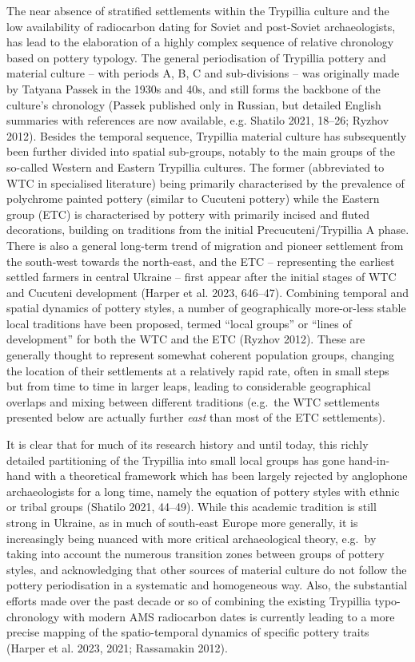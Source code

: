 \documentclass[
  12pt,
  a4paper, twoside]{book}
\begin{document}
The near absence of stratified settlements within the Trypillia culture and the low availability of radiocarbon dating for Soviet and post-Soviet archaeologists, has lead to the elaboration of a highly complex sequence of relative chronology based on pottery typology. The general periodisation of Trypillia pottery and material culture -- with periods A, B, C and sub-divisions -- was originally made by Tatyana Passek in the 1930s and 40s, and still forms the backbone of the culture's chronology (Passek published only in Russian, but detailed English summaries with references are now available, e.g. Shatilo 2021, 18--26; Ryzhov 2012). Besides the temporal sequence, Trypillia material culture has subsequently been further divided into spatial sub-groups, notably to the main groups of the so-called Western and Eastern Trypillia cultures. The former (abbreviated to WTC in specialised literature) being primarily characterised by the prevalence of polychrome painted pottery (similar to Cucuteni pottery) while the Eastern group (ETC) is characterised by pottery with primarily incised and fluted decorations, building on traditions from the initial Precucuteni/Trypillia A phase. There is also a general long-term trend of migration and pioneer settlement from the south-west towards the north-east, and the ETC -- representing the earliest settled farmers in central Ukraine -- first appear after the initial stages of WTC and Cucuteni development (Harper et al. 2023, 646--47). Combining temporal and spatial dynamics of pottery styles, a number of geographically more-or-less stable local traditions have been proposed, termed ``local groups'' or ``lines of development'' for both the WTC and the ETC (Ryzhov 2012). These are generally thought to represent somewhat coherent population groups, changing the location of their settlements at a relatively rapid rate, often in small steps but from time to time in larger leaps, leading to considerable geographical overlaps and mixing between different traditions (e.g.~the WTC settlements presented below are actually further \emph{east} than most of the ETC settlements).

It is clear that for much of its research history and until today, this richly detailed partitioning of the Trypillia into small local groups has gone hand-in-hand with a theoretical framework which has been largely rejected by anglophone archaeologists for a long time, namely the equation of pottery styles with ethnic or tribal groups (Shatilo 2021, 44--49). While this academic tradition is still strong in Ukraine, as in much of south-east Europe more generally, it is increasingly being nuanced with more critical archaeological theory, e.g.~by taking into account the numerous transition zones between groups of pottery styles, and acknowledging that other sources of material culture do not follow the pottery periodisation in a systematic and homogeneous way. Also, the substantial efforts made over the past decade or so of combining the existing Trypillia typo-chronology with modern AMS radiocarbon dates is currently leading to a more precise mapping of the spatio-temporal dynamics of specific pottery traits (Harper et al. 2023, 2021; Rassamakin 2012).
\end{document}
